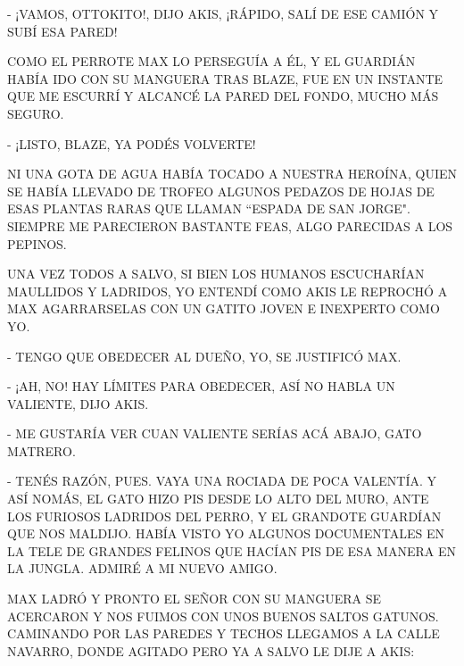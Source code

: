 - ¡VAMOS, OTTOKITO!, DIJO AKIS, ¡RÁPIDO, SALÍ DE ESE CAMIÓN Y SUBÍ ESA PARED!

COMO EL PERROTE MAX LO PERSEGUÍA A ÉL, Y EL GUARDIÁN HABÍA IDO CON SU MANGUERA TRAS BLAZE, FUE EN UN INSTANTE QUE ME ESCURRÍ Y ALCANCÉ LA PARED DEL FONDO, MUCHO MÁS SEGURO.

- ¡LISTO, BLAZE, YA PODÉS VOLVERTE!

NI UNA GOTA DE AGUA HABÍA TOCADO A NUESTRA HEROÍNA, QUIEN SE HABÍA LLEVADO DE TROFEO ALGUNOS PEDAZOS DE HOJAS DE ESAS PLANTAS RARAS QUE LLAMAN ``ESPADA DE SAN JORGE". SIEMPRE ME PARECIERON BASTANTE FEAS, ALGO PARECIDAS A LOS PEPINOS.



\newpage
{}
UNA VEZ TODOS A SALVO, SI BIEN LOS HUMANOS ESCUCHARÍAN MAULLIDOS Y LADRIDOS, YO ENTENDÍ COMO AKIS LE REPROCHÓ A MAX AGARRARSELAS CON UN GATITO JOVEN E INEXPERTO COMO YO.

- TENGO QUE OBEDECER AL DUEÑO, YO, SE JUSTIFICÓ MAX.

- ¡AH, NO! HAY LÍMITES PARA OBEDECER, ASÍ NO HABLA UN VALIENTE, DIJO AKIS.

- ME GUSTARÍA VER CUAN VALIENTE SERÍAS ACÁ ABAJO, GATO MATRERO.

- TENÉS RAZÓN, PUES. VAYA UNA ROCIADA DE POCA VALENTÍA.	
Y ASÍ NOMÁS, EL GATO HIZO PIS DESDE LO ALTO DEL MURO, ANTE LOS FURIOSOS LADRIDOS DEL PERRO, Y EL GRANDOTE GUARDÍAN QUE NOS MALDIJO. HABÍA VISTO YO ALGUNOS DOCUMENTALES EN LA TELE DE GRANDES FELINOS QUE HACÍAN PIS DE ESA MANERA EN LA JUNGLA. ADMIRÉ A MI NUEVO AMIGO.



\newpage
{}
MAX LADRÓ Y PRONTO EL SEÑOR CON SU MANGUERA SE ACERCARON Y NOS FUIMOS CON UNOS BUENOS SALTOS GATUNOS. CAMINANDO POR LAS PAREDES Y TECHOS LLEGAMOS A LA CALLE NAVARRO, DONDE AGITADO PERO YA A SALVO LE DIJE A AKIS:


